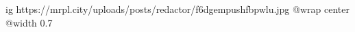  
 
 
 
 

\ifcmt
  ig https://mrpl.city/uploads/posts/redactor/f6dgempushfbpwlu.jpg
  @wrap center
  @width 0.7
\fi
